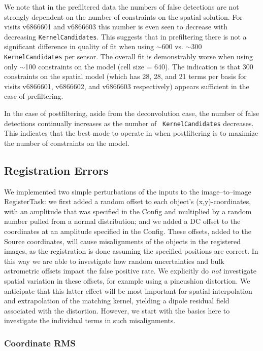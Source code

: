 \documentclass[prd, nofootinbib, floatfix, 11pt,tightenlines,times]{article}
\begin{document}
We note that in the prefiltered data the numbers of false detections
are not strongly dependent on the number of constraints on the spatial
solution.  For visits v6866601 and v6866603 this number is even seen
to decrease with decreasing {\tt KernelCandidates}.  This suggests
that in prefiltering there is not a significant difference in quality
of fit when using $\sim$600 vs. $\sim$300 {\tt KernelCandidates} per
sensor.  The overall fit is demonstrably worse when using only
$\sim$100 constraints on the model (cell size = 640).  The indication
is that 300 constraints on the spatial model (which has 28, 28, and 21
terms per basis for visits v6866601, v6866602, and v6866603
respectively) appears sufficient in the case of prefiltering.

In the case of postfiltering, aside from the deconvolution case, the
number of false detections continually increases as the number of {\tt
  KernelCandidates} decreases.  This indicates that the best mode to
operate in when postfiltering is to maximize the number of constraints
on the model.

\subsection{Registration Errors}

We implemented two simple perturbations of the inputs to the
image--to--image RegisterTask: we first added a random offset to each
object's (x,y)-coordinates, with an amplitude that was specified in
the Config and multiplied by a random number pulled from a normal
distribution; and we added a DC offset to the coordinates at an
amplitude specified in the Config.  These offsets, added to the Source
coordinates, will cause misalignments of the objects in the registered
images, as the registration is done assuming the specified positions
are correct.  In this way we are able to investigate how random
uncertainties and bulk astrometric offsets impact the false positive
rate.  We explicitly do {\it not} investigate spatial variation in
these offsets, for example using a pincushion distortion.  We
anticipate that this latter effect will be most important for spatial
interpolation and extrapolation of the matching kernel, yielding a
dipole residual field associated with the distortion.  However, we
start with the basics here to investigate the individual terms in such
misalignments.

\subsubsection{Coordinate RMS}
\end{document}
